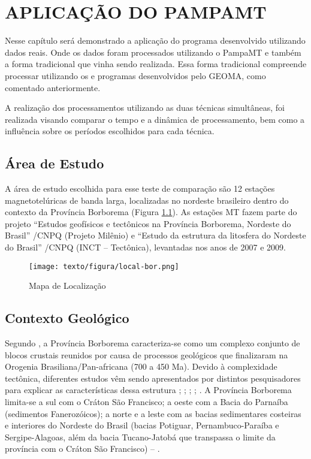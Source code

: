 \chapter{APLICAÇÃO DO PAMPAMT}
    
    Nesse capítulo será demonstrado a aplicação do programa desenvolvido utilizando dados reais. Onde os dados foram processados utilizando o PampaMT e também a forma tradicional que vinha sendo realizada. Essa forma tradicional compreende processar utilizando os  e programas desenvolvidos pelo GEOMA, como comentado anteriormente.
    
    A realização dos processamentos utilizando as duas técnicas simultâneas, foi realizada visando comparar o tempo e a dinâmica de processamento, bem como a influência sobre os períodos escolhidos para cada técnica.  
    
    \section{Área de Estudo}
        
        A área de estudo escolhida para esse teste de comparação são 12 estações magnetotelúricas de banda larga, localizadas no nordeste brasileiro dentro do contexto da Província Borborema (Figura \ref{local-bor}). As estações MT fazem parte do projeto ``Estudos geofísicos e tectônicos na Província Borborema, Nordeste do Brasil” /CNPQ (Projeto Milênio) e “Estudo da estrutura da litosfera do Nordeste do Brasil” /CNPQ (INCT – Tectônica), levantadas nos anos de 2007 e 2009.
        
    \begin{figure}[H]
        \caption{Mapa de Localização}
            \begin{center}
                \texttt{[image: texto/figura/local-bor.png]}
            \end{center}
        \label{local-bor}
    \end{figure}        
        
    \section{Contexto Geológico}
    
    Segundo \cite{almeida}, a Província Borborema caracteriza-se como um complexo conjunto de blocos crustais reunidos por causa de processos geológicos que finalizaram na Orogenia Brasiliana/Pan-africana (700 a 450 Ma). Devido à complexidade tectônica, diferentes estudos vêm sendo apresentados por distintos pesquisadores para explicar as características dessa estrutura \cite{van}; \cite{teseandrea}; \cite{santos2014deep}; \cite{padilha}; \cite{barbosa}. A Província Borborema limita-se a sul com o Cráton São Francisco; a oeste com a Bacia do Parnaíba (sedimentos Fanerozóicos); a norte e a leste com as bacias sedimentares costeiras e interiores do Nordeste do Brasil (bacias Potiguar, Pernambuco-Paraíba e Sergipe-Alagoas, além da bacia Tucano-Jatobá que transpassa o limite da província com o Cráton São Francisco) -- \cite{medeiros}.    
    
